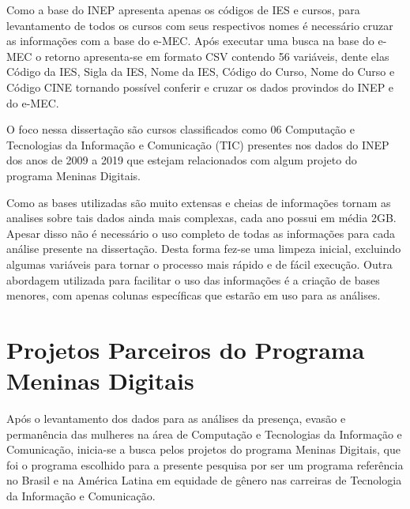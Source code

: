 Como a base do INEP apresenta apenas os códigos de IES e cursos, para levantamento de todos os cursos com seus respectivos nomes é necessário cruzar as informações com a base do e-MEC. Após executar uma busca na base do e-MEC o retorno apresenta-se em formato CSV contendo 56 variáveis, dente elas Código da IES, Sigla da IES, Nome da IES, Código do Curso, Nome do Curso e Código CINE tornando possível conferir e cruzar os dados provindos do INEP e do e-MEC.


O foco nessa dissertação são cursos classificados como 06 Computação e Tecnologias da Informação e Comunicação (TIC) presentes nos dados do INEP dos anos de 2009 a 2019 que estejam relacionados com algum projeto do programa Meninas Digitais.






Como as bases utilizadas são muito extensas e cheias de informações tornam as analises sobre tais dados ainda mais complexas, cada ano possui em média 2GB. Apesar disso não é necessário o uso completo de todas as informações para cada análise presente na dissertação. Desta forma fez-se uma limpeza inicial, excluindo algumas variáveis para tornar o processo mais rápido e de fácil execução. Outra abordagem utilizada para facilitar o uso das informações é a criação de bases menores, com apenas colunas específicas que estarão em uso para as análises.



\section{Projetos Parceiros do Programa Meninas Digitais}\label{sec:ProjetosLevantados}
Após o levantamento dos dados para as análises da presença, evasão e permanência das mulheres na área de Computação e Tecnologias da Informação e Comunicação, inicia-se a busca pelos projetos do programa Meninas Digitais, que foi o programa escolhido para a presente pesquisa por ser um programa referência no Brasil e na América Latina em equidade de gênero nas carreiras de Tecnologia da Informação e Comunicação.

